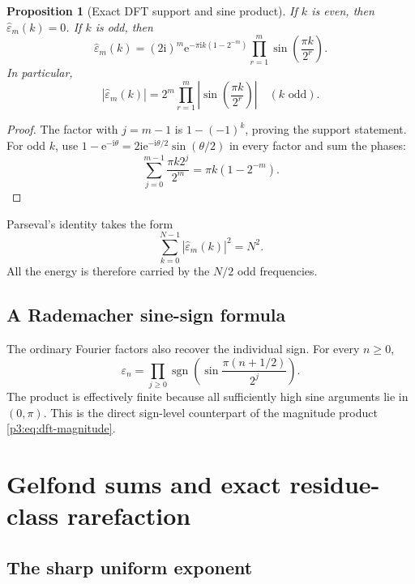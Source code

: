 \documentclass[11pt,oneside]{article}
\newtheorem{proposition}[theorem]{Proposition}
\theoremstyle{definition}
\theoremstyle{remark}
\newcommand{\e}{\mathrm e}
\newcommand{\ii}{\mathrm i}
\newcommand{\sgn}{\operatorname{sgn}}
\newcommand{\eps}{\varepsilon}
\begin{document}
\begin{proposition}[Exact DFT support and sine product]\label{p3:prop:dft-sine}
If $k$ is even, then $\widehat\eps_m(k)=0$.  If $k$ is odd, then
\begin{equation}\label{p3:eq:dft-sine}
 \widehat\eps_m(k)
 =(2\ii)^m\e^{-\pi\ii k(1-2^{-m})}
 \prod_{r=1}^{m}\sin\!\left(\frac{\pi k}{2^r}\right).
\end{equation}
In particular,
\begin{equation}\label{p3:eq:dft-magnitude}
 |\widehat\eps_m(k)|
 =2^m\prod_{r=1}^{m}
   \left|\sin\!\left(\frac{\pi k}{2^r}\right)\right|
 \quad(k\text{ odd}).
\end{equation}
\end{proposition}

\begin{proof}
The factor with $j=m-1$ is $1-(-1)^k$, proving the support statement.  For
odd $k$, use
$1-\e^{-\ii\theta}=2\ii\e^{-\ii\theta/2}\sin(\theta/2)$ in every factor and
sum the phases:
\[
 \sum_{j=0}^{m-1}\frac{\pi k2^j}{2^m}
 =\pi k(1-2^{-m}).
\]
\end{proof}

Parseval's identity takes the form
\begin{equation}\label{p3:eq:dft-parseval}
 \sum_{k=0}^{N-1}|\widehat\eps_m(k)|^2=N^2.
\end{equation}
All the energy is therefore carried by the $N/2$ odd frequencies.

\subsection{A Rademacher sine-sign formula}

The ordinary Fourier factors also recover the individual sign.  For every
$n\ge0$,
\begin{equation}\label{p3:eq:rademacher-sign}
 \eps_n=\prod_{j\ge0}
 \sgn\!\left(\sin\frac{\pi(n+1/2)}{2^j}\right).
\end{equation}
The product is effectively finite because all sufficiently high sine arguments
lie in $(0,\pi)$.  This is the direct sign-level counterpart of the magnitude
product \cref{p3:eq:dft-magnitude}.

\section{Gelfond sums and exact residue-class rarefaction}\label{p3:sec:gelfond}

\subsection{The sharp uniform exponent}
\end{document}

